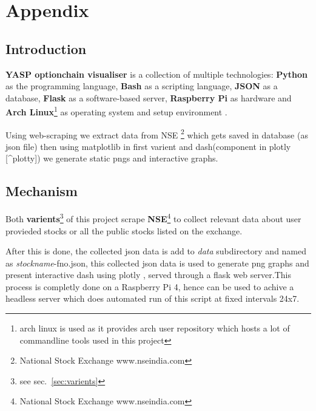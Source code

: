 \hypertarget{appendix}{%
\section*{Appendix}\label{appendix}}

\tableofcontents
\listoffigures

\newpage

\begin{multicols}{2}

\hypertarget{introduction}{%
\section{Introduction}\label{introduction}}

\textbf{YASP optionchain visualiser} is a collection of multiple
technologies: \textbf{Python} as the programming language, \textbf{Bash}
as a scripting language, \textbf{JSON} as a database, \textbf{Flask} as
a software-based server, \textbf{Raspberry Pi} as hardware and
\textbf{Arch Linux}\footnote{arch linux is used as it provides arch user
  repository which hosts a lot of commandline tools used in this project}
as operating system and setup environment .

Using web-scraping we extract data from NSE \footnote{National Stock
  Exchange www.nseindia.com} which gets saved in database (as json file)
then using matplotlib in first varient and dash(component in plotly
{[}\^{}plotty{]}) we generate static pngs and interactive graphs.

\hypertarget{mechanism}{%
\subsection{Mechanism}\label{mechanism}}

Both \textbf{varients}\footnote{see sec.~\ref{sec:varients}} of this
project scrape \textbf{NSE}\footnote{National Stock Exchange
  www.nseindia.com} to collect relevant data about user provieded stocks
or all the public stocks listed on the exchange.

After this is done, the collected json data is add to \emph{data}
subdirectory and named as \emph{stockname}-fno.json, this collected json
data is used to generate png graphs and present interactive dash using
plotly , served through a flask web server.This process is completly
done on a Raspberry Pi 4, hence can be used to achive a headless server
which does automated run of this script at fixed intervals 24x7.


\end{multicols}
